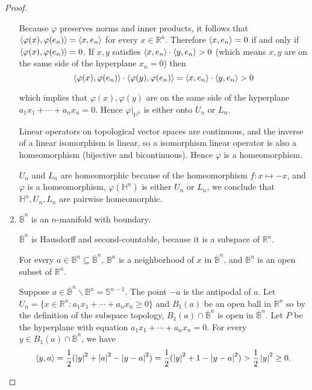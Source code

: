 \begin{proof}
\begin{enumerate}[label={\textbf{Step \arabic*.}},itemindent=1cm]
              Because $\varphi$ preserves norms and inner products, it follows that $\left\langle{\varphi(x), \varphi(e_{n})}\right\rangle = \left\langle{x, e_{n}}\right\rangle$ for every $x\in\mathbb{R}^{n}$. Therefore $\left\langle{x, e_{n}}\right\rangle = 0$ if and only if $\left\langle{\varphi(x), \varphi(e_{n})}\right\rangle = 0$. If $x, y$ satisfies $\left\langle{x, e_{n}}\right\rangle \cdot \left\langle{y, e_{n}}\right\rangle > 0$ (which means $x, y$ are on the same side of the hyperplane $x_{n} = 0$) then
              \[
                  \left\langle{\varphi(x), \varphi(e_{n})}\right\rangle\cdot\left\langle{\varphi(y), \varphi(e_{n})}\right\rangle = \left\langle{x, e_{n}}\right\rangle\cdot\left\langle{y, e_{n}}\right\rangle > 0
              \]

              which implies that $\varphi(x), \varphi(y)$ are on the same side of the hyperplane $a_{1}x_{1} + \cdots + a_{n}x_{n} = 0$. Hence $\varphi\vert_{\mathbb{H}^{n}}$ is either onto $U_{n}$ or $L_{n}$.

              Linear operators on topological vector spaces are continuous, and the inverse of a linear isomorphism is linear, so a isomorphism linear operator is also a homeomorphism (bijective and bicontinuous). Hence $\varphi$ is a homeomorphism.

              $U_{n}$ and $L_{n}$ are homeomorphic because of the homeomorphism $f: x\mapsto -x$, and $\varphi$ is a homeomorphism, $\varphi(\mathbb{H}^{n})$ is either $U_{n}$ or $L_{n}$, we conclude that $\mathbb{H}^{n}, U_{n}, L_{n}$ are pairwise homeomorphic.
        \item $\overline{\mathbb{B}}^{n}$ is an $n$-manifold with boundary.

              $\overline{\mathbb{B}}^{n}$ is Hausdorff and second-countable, because it is a subspace of $\mathbb{R}^{n}$.

              For every $a\in \mathbb{B}^{n}\subseteq\overline{\mathbb{B}}^{n}$, $\mathbb{B}^{n}$ is a neighborhood of $x$ in $\overline{\mathbb{B}}^{n}$, and $\mathbb{B}^{n}$ is an open subset of $\mathbb{R}^{n}$.

              Suppose $a\in \overline{\mathbb{B}}^{n}\smallsetminus\mathbb{B}^{n} = \mathbb{S}^{n-1}$. The point $-a$ is the antipodal of $a$. Let $U_{n} = \{ x\in\mathbb{R}^{n}: a_{1}x_{1} + \cdots + a_{n}x_{n} \geq 0 \}$ and $B_{1}(a)$ be an open ball in $\mathbb{R}^{n}$ so by the definition of the subspace topology, $B_{1}(a)\cap \overline{\mathbb{B}}^{n}$ is open in $\overline{\mathbb{B}}^{n}$. Let $P$ be the hyperplane with equation $a_{1}x_{1} + \cdots + a_{n}x_{n} = 0$. For every $y\in B_{1}(a)\cap \overline{\mathbb{B}}^{n}$, we have
              \[
                  \left\langle{y, a}\right\rangle = \frac{1}{2}(\left\vert{y}\right\vert^{2} + \left\vert{a}\right\vert^{2} - \left\vert{y - a}\right\vert^{2}) = \frac{1}{2}(\left\vert{y}\right\vert^{2} + 1 - \left\vert{y - a}\right\vert^{2}) > \frac{1}{2}\left\vert{y}\right\vert^{2}\geq 0.
              \]


\end{enumerate}
\end{proof}
